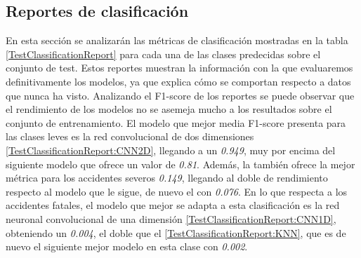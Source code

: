   \subsection{Reportes de clasificación}

    En esta sección se analizarán las métricas de clasificación mostradas en la tabla \eqref{TestClassificationReport} para cada una de las clases predecidas sobre el  conjunto de test. Estos reportes muestran la información con la que evaluaremos definitivamente los modelos, ya que explica cómo se comportan respecto a datos que nunca ha visto. Analizando el F1-score de los reportes se puede observar que el rendimiento de los modelos no se asemeja mucho a los resultados sobre el conjunto de entrenamiento. El modelo que mejor media F1-score presenta para las clases leves es la red convolucional de dos dimensiones \eqref{TestClassificationReport:CNN2D}, llegando a un \textit{0.949}, muy por encima del siguiente modelo  que ofrece un valor de \textit{0.81}. Además, la  también ofrece la mejor métrica para los accidentes severos \textit{0.149}, llegando al doble de rendimiento respecto al modelo que le sigue, de nuevo el  con \textit{0.076}. En lo que respecta a los accidentes fatales, el modelo que mejor se adapta a esta clasificación es la red neuronal convolucional de una dimensión \eqref{TestClassificationReport:CNN1D}, obteniendo un \textit{0.004}, el doble que el  \eqref{TestClassificationReport:KNN}, que es de nuevo el siguiente mejor modelo en esta clase con \textit{0.002}.


